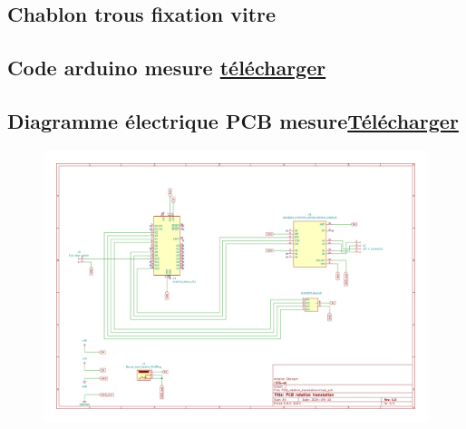 
\chapter{}
\section[Chablon trous vitre]{Chablon trous fixation vitre}\label{chablon_trous_vitre}
\newpage
\begin{figure}[H]
    \centering
    
\end{figure}

\newpage
\section[Code arduino mesure]{Code arduino mesure \href{https://1drv.ms/f/s!Altwa7Vt0GlIj4Bf6049yvu0P-8YLQ?e=v7KWOI}{télécharger}}\label{code:arduino_mesure}



\section[Diagramme électrique PCB mesure]{Diagramme électrique PCB mesure\href{https://1drv.ms/f/s!Altwa7Vt0GlIjv0bGlDjWqrtS53P8w?e=SVTypX}{Télécharger}}\label{PCB:mesure}
\begin{figure}[H]
    \centering
    \includegraphics[angle = 90,height = 0.8\paperheight]{assets/Annexes/PCB_rotation_translation_diagramme_elec.pdf}
\end{figure}